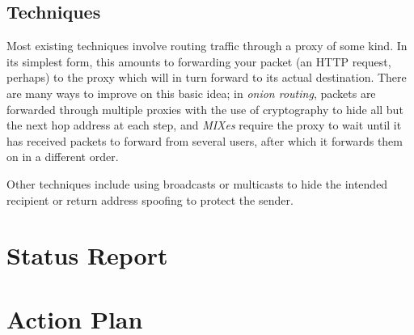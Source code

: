 \documentclass[11pt]{article}
\begin{document}
\subsection{Techniques}
Most existing techniques involve routing traffic through a proxy of some kind. In its simplest form, this amounts to forwarding your packet (an HTTP request, perhaps) to the proxy which will in turn forward to its actual destination. There are many ways to improve on this basic idea; in \emph{onion routing}, packets are forwarded through multiple proxies with the use of cryptography to hide all but the next hop address at each step, and \emph{MIXes} \cite{Chaum81} require the proxy to wait until it has received packets to forward from several users, after which it forwards them on in a different order.

Other techniques include using broadcasts or multicasts to hide the intended recipient or return address spoofing to protect the sender.


\section{Status Report}


\section{Action Plan}
\end{document}
